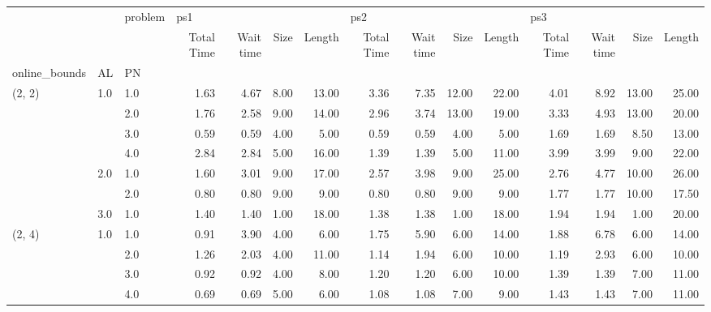 \begin{tabular}{lllrrrrrrrrrrrr}
\toprule
       &     & problem & \multicolumn{4}{l}{ps1} & \multicolumn{4}{l}{ps2} & \multicolumn{4}{l}{ps3} \\
       &     & {} & Total Time & Wait time & Size & Length & Total Time & Wait time &  Size & Length & Total Time & Wait time &  Size & Length \\
online\_bounds & AL & PN &            &           &      &        &            &           &       &        &            &           &       &        \\
\midrule
(2, 2) & 1.0 & 1.0  &       1.63 &      4.67 & 8.00 &  13.00 &       3.36 &      7.35 & 12.00 &  22.00 &       4.01 &      8.92 & 13.00 &  25.00 \\
       &     & 2.0  &       1.76 &      2.58 & 9.00 &  14.00 &       2.96 &      3.74 & 13.00 &  19.00 &       3.33 &      4.93 & 13.00 &  20.00 \\
       &     & 3.0  &       0.59 &      0.59 & 4.00 &   5.00 &       0.59 &      0.59 &  4.00 &   5.00 &       1.69 &      1.69 &  8.50 &  13.00 \\
       &     & 4.0  &       2.84 &      2.84 & 5.00 &  16.00 &       1.39 &      1.39 &  5.00 &  11.00 &       3.99 &      3.99 &  9.00 &  22.00 \\
       & 2.0 & 1.0  &       1.60 &      3.01 & 9.00 &  17.00 &       2.57 &      3.98 &  9.00 &  25.00 &       2.76 &      4.77 & 10.00 &  26.00 \\
       &     & 2.0  &       0.80 &      0.80 & 9.00 &   9.00 &       0.80 &      0.80 &  9.00 &   9.00 &       1.77 &      1.77 & 10.00 &  17.50 \\
       & 3.0 & 1.0  &       1.40 &      1.40 & 1.00 &  18.00 &       1.38 &      1.38 &  1.00 &  18.00 &       1.94 &      1.94 &  1.00 &  20.00 \\
(2, 4) & 1.0 & 1.0  &       0.91 &      3.90 & 4.00 &   6.00 &       1.75 &      5.90 &  6.00 &  14.00 &       1.88 &      6.78 &  6.00 &  14.00 \\
       &     & 2.0  &       1.26 &      2.03 & 4.00 &  11.00 &       1.14 &      1.94 &  6.00 &  10.00 &       1.19 &      2.93 &  6.00 &  10.00 \\
       &     & 3.0  &       0.92 &      0.92 & 4.00 &   8.00 &       1.20 &      1.20 &  6.00 &  10.00 &       1.39 &      1.39 &  7.00 &  11.00 \\
       &     & 4.0  &       0.69 &      0.69 & 5.00 &   6.00 &       1.08 &      1.08 &  7.00 &   9.00 &       1.43 &      1.43 &  7.00 &  11.00 \\

\end{tabular}
